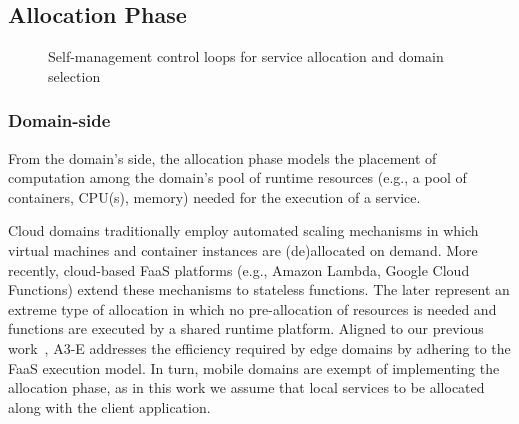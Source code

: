 \subsection{Allocation Phase}\label{sec:A3-E-allocation}

\begin{figure}[thbp]
	\centering
	\captionsetup[subfigure]{width=0.4\textwidth}	
	\null\hfill
	\captionsetup[subfigure]{width=0.4\textwidth}	
	\hfill
	\hfill\null
	\caption{Self-management control loops for service allocation and domain selection}\label{fig:allocation-loops}
\end{figure}

\subsubsection*{Domain-side} From the domain's side, the allocation phase models the placement of computation among the domain's pool of runtime resources (e.g., a pool of containers, CPU(s), memory) needed for the execution of a service. 

Cloud domains traditionally employ automated scaling mechanisms in which virtual machines and container instances are (de)allocated on demand. More recently, cloud-based FaaS platforms (e.g., Amazon Lambda, Google Cloud Functions) extend these mechanisms to stateless functions. The later represent an extreme type of allocation in which no pre-allocation of resources is needed and functions are executed by a shared runtime platform. Aligned to our previous work~\cite{GarrigaMendonca2017}, A3-E addresses the efficiency required by edge domains by adhering to the FaaS execution model.
In turn, mobile domains are exempt of implementing the allocation phase, as in this work we assume that local services to be allocated along with the client application.

